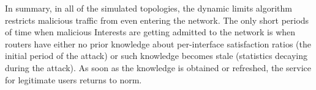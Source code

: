 In summary, in all of the simulated topologies, the dynamic limits algorithm restricts malicious traffic from even entering the network.
The only short periods of time when malicious Interests are getting admitted to the network is when routers have either no prior knowledge about per-interface satisfaction ratios (the initial period of the attack) or such knowledge becomes stale (statistics decaying during the attack).
As soon as the knowledge is obtained or refreshed, the service for legitimate users returns to norm.





